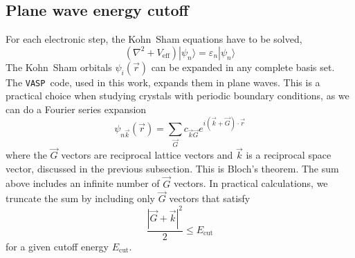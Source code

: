 \documentclass[11pt,bibliography=totoc,index=totoc]{scrbook}   %
\newcommand{\vasp}{{\texttt{VASP}}} %
\begin{document}




\subsection{Plane wave energy cutoff}\label{sec:parameters:e}

For each electronic step, the Kohn~Sham equations have to be solved,
\begin{equation}
  (\nabla^2 + V_{\text{eff}}) |\psi_n\rangle = \varepsilon_n |\psi_n\rangle
\end{equation}
The Kohn~Sham orbitals $\psi_i(\vec{r})$ can be expanded in any complete basis set. 
The \vasp\ code, used in this work, expands them in plane waves. 
This is a practical choice when studying crystals with periodic boundary conditions, as we can do a Fourier series expansion
\begin{equation}
  \psi_{n\vec{k}}(\vec{r}) = \sum_{\vec{G}} c_{\vec{k}\vec{G}} e^{i(\vec{k}+\vec{G})\cdot\vec{r}}
\end{equation}
where the $\vec{G}$ vectors are reciprocal lattice vectors and $\vec{k}$ is a reciprocal space vector, discussed in the previous subsection.
This is Bloch's theorem. The sum above includes an infinite number of $\vec{G}$ vectors. In practical calculations, we
truncate the sum by including only $\vec{G}$ vectors that satisfy
\begin{equation}
  \frac{|\vec{G}+\vec{k}|^2}{2} \leq E_{\text{cut}}
\end{equation}
for a given cutoff energy $E_{\text{cut}}$.



\end{document}
